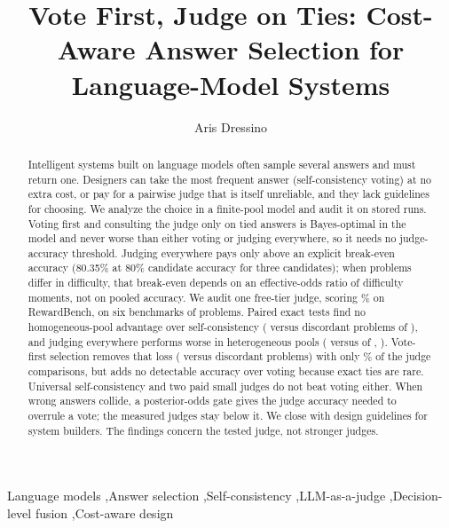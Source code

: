 \documentclass[preprint,11pt,number,sort&compress]{elsarticle}
\begin{document}
\begin{frontmatter}

\title{Vote First, Judge on Ties: Cost-Aware Answer Selection for Language-Model Systems}

\author[inst1]{Aris Dressino}

\begin{abstract}
Intelligent systems built on language models often sample several answers and must return one. Designers can take the most frequent answer (self-consistency voting) at no extra cost, or pay for a pairwise judge that is itself unreliable, and they lack guidelines for choosing. We analyze the choice in a finite-pool model and audit it on stored runs. Voting first and consulting the judge only on tied answers is Bayes-optimal in the model and never worse than either voting or judging everywhere, so it needs no judge-accuracy threshold. Judging everywhere pays only above an explicit break-even accuracy (80.35\% at 80\% candidate accuracy for three candidates); when problems differ in difficulty, that break-even depends on an effective-odds ratio of difficulty moments, not on pooled accuracy. We audit one free-tier judge, scoring \RBOverallAcc\% on RewardBench, on six benchmarks of \TotalProblems{} problems. Paired exact tests find no homogeneous-pool advantage over self-consistency (\HomogPooledB{} versus \HomogPooledC{} discordant problems of \HomogPooledN{}), and judging everywhere performs worse in heterogeneous pools (\HeteroPooledB{} versus \HeteroPooledC{} of \HeteroPooledN{}, \HeteroPooledP). Vote-first selection removes that loss (\HybHetBCop{} versus \HybHetCCop{} discordant problems) with only \HybHetCallShare\% of the judge comparisons, but adds no detectable accuracy over voting because exact ties are rare. Universal self-consistency and two paid small judges do not beat voting either. When wrong answers collide, a posterior-odds gate gives the judge accuracy needed to overrule a vote; the measured judges stay below it. We close with design guidelines for system builders. The findings concern the tested judge, not stronger judges.
\end{abstract}

\begin{keyword}
Language models \sep Answer selection \sep Self-consistency \sep LLM-as-a-judge \sep Decision-level fusion \sep Cost-aware design
\end{keyword}

\end{frontmatter}
\end{document}
